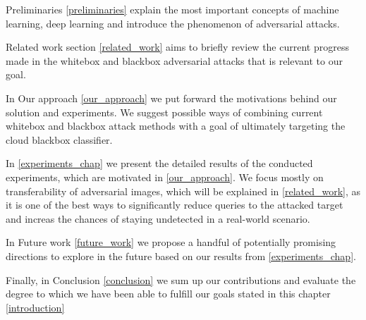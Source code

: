 Preliminaries \ref{preliminaries} explain the most important concepts of machine learning, deep learning and introduce the phenomenon of adversarial attacks.

Related work section \ref{related_work} aims to briefly review the current progress made in the whitebox and blackbox adversarial attacks that is relevant to our goal.

In Our approach \ref{our_approach} we put forward the motivations behind our solution and experiments. We suggest possible ways of combining current whitebox and blackbox attack methods with a goal of ultimately targeting the cloud blackbox classifier.

In \ref{experiments_chap} we present the detailed results of the conducted experiments, which are motivated in \ref{our_approach}. We focus mostly on transferability of adversarial images, which will be explained in \ref{related_work}, as it is one of the best ways to significantly reduce queries to the attacked target and increas the chances of staying undetected in a real-world scenario.

In Future work \ref{future_work} we propose a handful of potentially promising directions to explore in the future based on our results from \ref{experiments_chap}.

Finally, in Conclusion \ref{conclusion} we sum up our contributions and evaluate the degree to which we have been able to fulfill our goals stated in this chapter \ref{introduction}